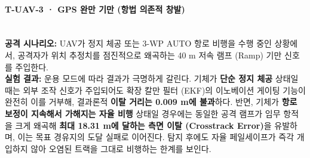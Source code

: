 \paragraph{\textbf{T-UAV-3 · GPS 완만 기만 (항법 의존적 창발)}} ~\\
\textbf{공격 시나리오:} UAV가 정지 체공 또는 3-WP AUTO 항로 비행을 수행 중인 상황에서, 공격자가 위치 추정치를 점진적으로 왜곡하는 40 m 저속 램프 (Ramp) 기만 신호를 주입한다.\\
\textbf{실험 결과:} 운용 모드에 따라 결과가 극명하게 갈린다. 
기체가 \textbf{단순 정지 체공} 상태일 때는 외부 조작 신호가 주입되어도 확장 칼만 필터 (EKF)의 이노베이션 게이팅 기능이 완전히 이를 거부해, 결과론적 \textbf{이탈 거리는 0.009 m에 불과}하다. 반면, 기체가 \textbf{항로 보정이 지속해서 가해지는 자율 비행} 상태일 경우에는 동일한 공격 램프가 임무 항적을 크게 왜곡해 \textbf{최대 18.31 m에 달하는 측면 이탈 (Crosstrack Error)}을 유발하며, 이는 목표 경유지의 도달 실패로 이어진다.
탐지 후에도 자율 페일세이프가 즉각 개입하지 않아 오염된 트랙을 그대로 비행하는 한계를 보인다.\\
